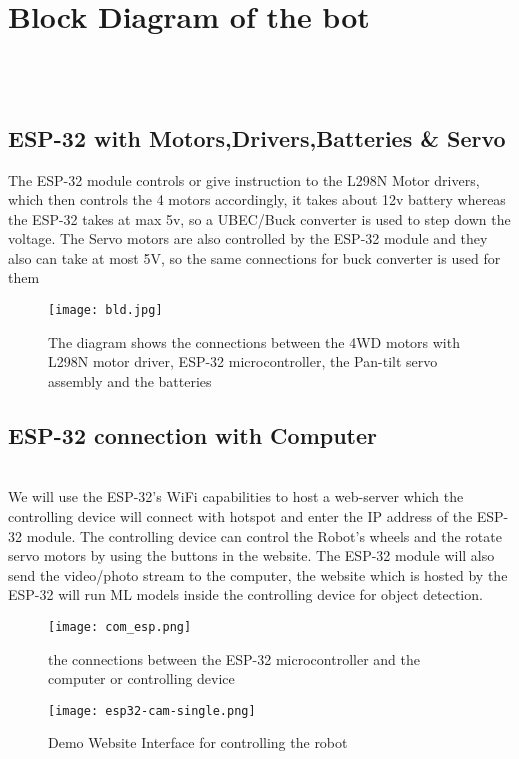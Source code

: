 \documentclass[12pt]{article}
\begin{document}
\section{Block Diagram of the bot}\\\\

\subsection{ESP-32 with Motors,Drivers,Batteries & Servo}
{The ESP-32 module controls or give instruction to the L298N Motor drivers, which then controls the 4 motors accordingly, it takes about 12v battery whereas the ESP-32 takes at max 5v, so a UBEC/Buck converter is used to step down the voltage. The Servo motors are also controlled by the ESP-32 module and they also can take at most 5V, so the same connections for buck converter is used for them}
\begin{figure}[h]
    \centering
    \texttt{[image: bld.jpg]}
    \caption{The diagram shows the connections between the 4WD motors with L298N motor driver, ESP-32 microcontroller, the Pan-tilt servo assembly and the batteries}
    \label{fig:enter-label}
\end{figure}

\newpage
\subsection{ESP-32 connection with Computer}\\
We will use the ESP-32's WiFi capabilities to host a web-server which the controlling device will connect with hotspot and enter the IP address of the ESP-32 module. The controlling device can control the Robot's wheels and the rotate servo motors by using the buttons in the website. The ESP-32 module will also send the video/photo stream to the computer, the website which is hosted by the ESP-32 will run ML models inside the controlling device for object detection. 
\begin{figure}[h]
    \centering
    \texttt{[image: com\_esp.png]}
    \caption{{the connections between the ESP-32 microcontroller and the computer or controlling device}}
    \label{fig:enter-label}
\end{figure}
\begin{figure}[h]
    \centering
    \texttt{[image: esp32-cam-single.png]}
    \caption{Demo Website Interface for controlling the robot}
    \label{fig:enter-label}
\end{figure}
\end{document}
